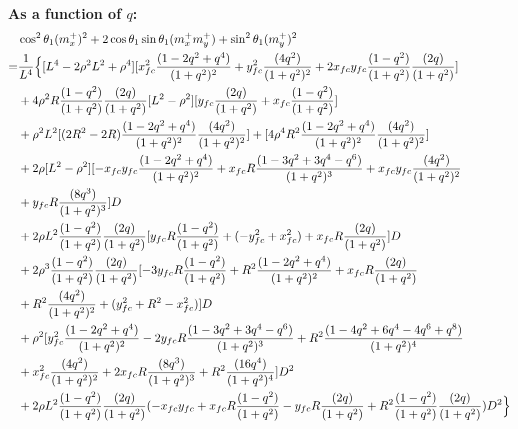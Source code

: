 \documentclass[12pt]{article}
\begin{document}
\textbf{As a function of $q$:}
\begin{align}
    &\cos^2\theta_1(m_x^+)^2  + 2\cos\theta_1\sin\theta_1(m_x^+m_y^+)  +\sin^2\theta_1(m_y^+)^2 \\
    =& \frac{1}{L^4} \Bigl\{ [ L^4 -2\rho^2L^2 + \rho^4 ][x_{fc}^2\frac{(1-2q^2+q^4)}{(1+q^2)^2}  + y_{fc}^2\frac{(4q^2)}{(1+q^2)^2} + 2x_{fc}y_{fc}\frac{(1-q^2)}{(1+q^2)}\frac{(2q)}{(1+q^2)}] \nonumber\\
    &+  4\rho^2R\frac{(1-q^2)}{(1+q^2)}\frac{(2q)}{(1+q^2)}[ L^2 - \rho^2 ][ y_{fc}\frac{(2q)}{(1+q^2)} + x_{fc}\frac{(1-q^2)}{(1+q^2)} ] \nonumber\\
    &+ \rho^2L^2[(2R^2-2R)\frac{(1-2q^2+q^4)}{(1+q^2)^2}\frac{(4q^2)}{(1+q^2)^2}] + [ 4\rho^4R^2\frac{(1-2q^2+q^4)}{(1+q^2)^2}\frac{(4q^2)}{(1+q^2)^2}  ] \nonumber\\
    &+ 2\rho[  L^2 - \rho^2  ][ -x_{fc}y_{fc}\frac{(1-2q^2+q^4)}{(1+q^2)^2} +x_{fc}R\frac{(1-3q^2+3q^4-q^6)}{(1+q^2)^3} + x_{fc}y_{fc}\frac{(4q^2)}{(1+q^2)^2} \nonumber\\
    &+ y_{fc}R\frac{(8q^3)}{(1+q^2)^3} ]D \nonumber\\
    &+ 2\rho L^2\frac{(1-q^2)}{(1+q^2)}\frac{(2q)}{(1+q^2)}[y_{fc}R\frac{(1-q^2)}{(1+q^2)} + (-y_{fc}^2 + x_{fc}^2) + x_{fc}R\frac{(2q)}{(1+q^2)} ]D \nonumber\\
    &+ 2\rho^3\frac{(1-q^2)}{(1+q^2)}\frac{(2q)}{(1+q^2)}[ -3y_{fc}R\frac{(1-q^2)}{(1+q^2)} +R^2\frac{(1-2q^2+q^4)}{(1+q^2)^2} + x_{fc}R\frac{(2q)}{(1+q^2)} \nonumber\\
    &+ R^2\frac{(4q^2)}{(1+q^2)^2} +  (y_{fc}^2 +R^2 -x_{fc}^2)  ]D \nonumber\\
    &+ \rho^2[y_{fc}^2\frac{(1-2q^2+q^4)}{(1+q^2)^2} -2y_{fc}R\frac{(1-3q^2+3q^4-q^6)}{(1+q^2)^3} +R^2\frac{(1-4q^2+ 6q^4-4q^6+q^8)}{(1+q^2)^4} \nonumber\\
    &+ x_{fc}^2\frac{(4q^2)}{(1+q^2)^2} + 2x_{fc}R\frac{(8q^3)}{(1+q^2)^3} + R^2\frac{(16q^4)}{(1+q^2)^4}]D^2 \nonumber\\
    &+ 2\rho L^2\frac{(1-q^2)}{(1+q^2)}\frac{(2q)}{(1+q^2)}(-x_{fc}y_{fc} + x_{fc}R\frac{(1-q^2)}{(1+q^2)} -y_{fc}R\frac{(2q)}{(1+q^2)} +  R^2\frac{(1-q^2)}{(1+q^2)}\frac{(2q)}{(1+q^2)} )D^2 \Bigr\}
\end{align}
\end{document}
